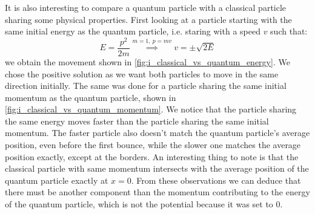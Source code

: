 It is also interesting to compare a quantum particle with a classical particle sharing some physical properties. First looking at a particle starting with the same initial energy as the quantum particle, i.e. staring with a speed \(v\) such that:
\begin{equation}
    E = \frac{p^2}{2m} \stackrel{m=1,\ p=mv}{\implies} v = \pm \sqrt{2E}
\end{equation}
we obtain the movement shown in \autoref{fig:i_classical_vs_quantum_energy}. We chose the positive solution as we want both particles to move in the same direction initially. The same was done for a particle sharing the same initial momentum as the quantum particle, shown in \autoref{fig:i_classical_vs_quantum_momentum}. We notice that the particle sharing the same energy moves faster than the particle sharing the same initial momentum. The faster particle also doesn't match the quantum particle's average position, even before the first bounce, while the slower one matches the average position exactly, except at the borders. An interesting thing to note is that the classical particle with same momentum intersects with the average position of the quantum particle exactly at \(x=0\). From these observations we can deduce that there must be another component than the momentum contributing to the energy of the quantum particle, which is not the potential because it was set to 0.

